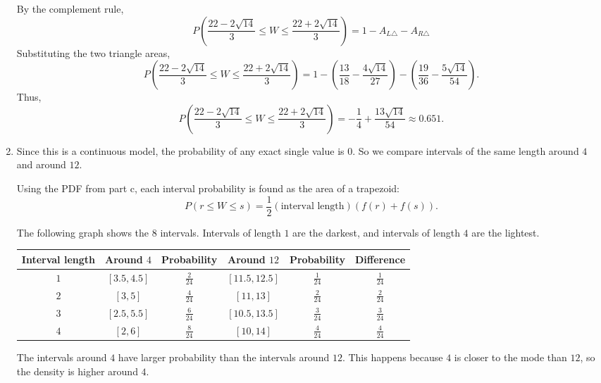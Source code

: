 \begin{enumerate}[label=\textbf{\alph*)}]
	By the complement rule,
	\[
	P\left(\frac{22-2\sqrt{14}}{3}\le W\le \frac{22+2\sqrt{14}}{3}\right)
	=
	1-A_{L\triangle}-A_{R\triangle}
	\]
	Substituting the two triangle areas,
	\[
	P\left(\frac{22-2\sqrt{14}}{3}\le W\le \frac{22+2\sqrt{14}}{3}\right)
	=
	1-
	\left(\frac{13}{18}-\frac{4\sqrt{14}}{27}\right)
	-
	\left(\frac{19}{36}-\frac{5\sqrt{14}}{54}\right).
	\]
	Thus,
	\[
	P\left(\frac{22-2\sqrt{14}}{3}\le W\le \frac{22+2\sqrt{14}}{3}\right)
	=
	-\frac{1}{4}+\frac{13\sqrt{14}}{54}
	\approx 0.651.
	\]
	
	\item Since this is a continuous model, the probability of any exact single value is \(0\). So we compare intervals of the same length around \(4\) and around \(12\).
	
	Using the PDF from part c, each interval probability is found as the area of a trapezoid:
	\[
	P(r\le W\le s)
	=
	\frac{1}{2}(\text{interval length})(f(r)+f(s)).
	\]
	
	The following graph shows the \(8\) intervals. Intervals of length \(1\) are the darkest, and intervals of length \(4\) are the lightest.
	
	
	\begin{center}
		\begin{tabular}{c c c c c c}
			\hline
			Interval length & Around \(4\) & Probability & Around \(12\) & Probability & Difference \\
			\hline
			\(1\) & \([3.5,4.5]\) & \(\frac{2}{24}\) & \([11.5,12.5]\) & \(\frac{1}{24}\) & \(\frac{1}{24}\) \\
			\(2\) & \([3,5]\) & \(\frac{4}{24}\) & \([11,13]\) & \(\frac{2}{24}\) & \(\frac{2}{24}\) \\
			\(3\) & \([2.5,5.5]\) & \(\frac{6}{24}\) & \([10.5,13.5]\) & \(\frac{3}{24}\) & \(\frac{3}{24}\) \\
			\(4\) & \([2,6]\) & \(\frac{8}{24}\) & \([10,14]\) & \(\frac{4}{24}\) & \(\frac{4}{24}\) \\
			\hline
		\end{tabular}
	\end{center}
	
	The intervals around \(4\) have larger probability than the intervals around \(12\). This happens because \(4\) is closer to the mode than \(12\), so the density is higher around \(4\).
	
\end{enumerate}

